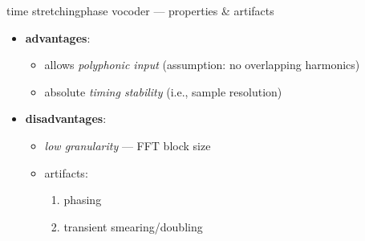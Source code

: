 
    \begin{frame}{time stretching}{phase vocoder --- properties \& artifacts}
        \begin{itemize}
            \item   \textbf{advantages}:
                \begin{itemize}
                    \item   allows \textit{polyphonic input} (assumption: no overlapping harmonics)
                    \item   absolute \textit{timing stability} (i.e., sample resolution)
                \end{itemize}   
            \pause
            \bigskip
            \item   \textbf{disadvantages}:
                \begin{itemize}
                    \item   \textit{low granularity} --- FFT block size
                    \item   artifacts:
                        \begin{enumerate}
                            \item   phasing
                            \item   transient smearing/doubling
                        \end{enumerate}
                \end{itemize}
        \end{itemize}
    \end{frame}

